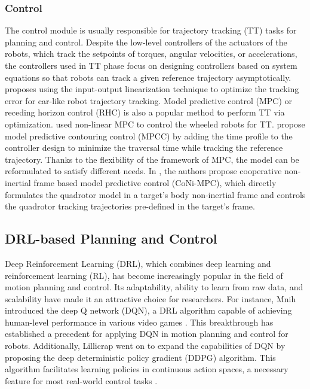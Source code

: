 \documentclass[letterpaper,journal,twoside]{IEEEtran}
\begin{document}
\subsubsection{Control}
The control module is usually responsible for trajectory 
tracking (TT) tasks for planning and control.
Despite the low-level controllers of the actuators of the 
robots, which track the setpoints of torques, angular 
velocities, or accelerations, the controllers used in TT
phase focus on designing controllers based on system
equations so that robots can track a given reference 
trajectory asymptotically. 
\cite{majd2019stable} proposes using the input-output 
linearization technique to optimize the tracking error for
car-like robot trajectory tracking.
Model predictive control (MPC) or receding horizon control (RHC)
is also a popular method to perform TT via optimization.
\cite{kunhe2005mobile} used non-linear MPC to control the 
wheeled robots for TT.
\cite{romero2022model,ji2021cmpcc} propose model predictive
contouring control (MPCC) by adding the time profile to the 
controller design to minimize the traversal time while tracking
the reference trajectory.
Thanks to the flexibility of the framework of MPC, the model 
can be reformulated to satisfy different needs. 
In \cite{zhang2023coni}, the authors propose cooperative 
non-inertial frame based model predictive control (CoNi-MPC), 
which directly formulates the quadrotor model in a target's 
body non-inertial frame and controls the quadrotor tracking 
trajectories pre-defined in the target's frame.

\subsection{DRL-based Planning and Control}
Deep Reinforcement Learning (DRL), which combines deep learning 
and reinforcement learning (RL), 
has become increasingly popular in the field of motion planning 
and control. 
Its adaptability, ability to learn from raw data, and scalability 
have made it an attractive choice for researchers.
For instance, Mnih \etal introduced the deep Q network (DQN), 
a DRL algorithm capable of achieving human-level performance in various video games \cite{mnih2015human}. 
This breakthrough has established a precedent for applying 
DQN in motion planning and control for robots. 
Additionally, Lillicrap \etal went on to expand the 
capabilities of DQN by proposing the deep deterministic policy 
gradient (DDPG) algorithm. 
This algorithm facilitates learning policies in continuous action 
spaces, a necessary feature for most real-world control tasks 
\cite{lillicrap2015continuous}.
\end{document}
